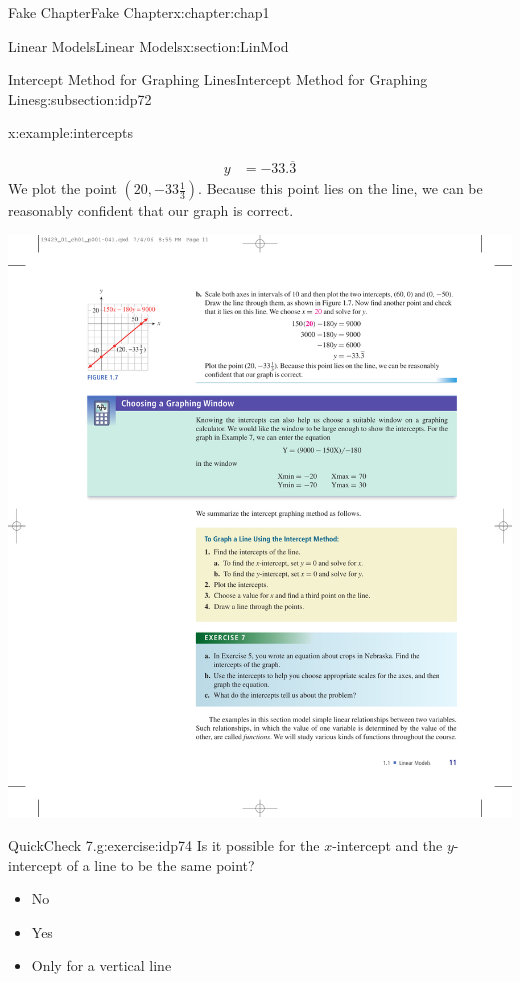 \documentclass[oneside,10pt,]{book}
\numberwithin{equation}{section}
\newcommand{\amp}{&}
\begin{document}
\begin{chapterptx}{Fake Chapter}{}{Fake Chapter}{}{}{x:chapter:chap1}
\begin{sectionptx}{Linear Models}{}{Linear Models}{}{}{x:section:LinMod}
\begin{subsectionptx}{Intercept Method for Graphing Lines}{}{Intercept Method for Graphing Lines}{}{}{g:subsection:idp72}
\begin{example}{}{x:example:intercepts}
\begin{enumerate}[label=\alph*]
\begin{align*}
y \amp =-33.\overline{3}
\end{align*}
We plot the point \((20, -33\frac{1}{3})\). Because this point lies on the line, we can be reasonably confident that our graph is correct.%
\begin{sidebyside}{1}{0.35}{0.35}{0}%
\begin{sbspanel}{0.3}%
\includegraphics[width=\linewidth]{external/photos/fig-example-graph-intercepts.pdf}
\end{sbspanel}%
\end{sidebyside}%
\end{enumerate}
%
\end{example}
\begin{inlineexercise}{QuickCheck 7.}{g:exercise:idp74}%
Is it possible for the \(x\)-intercept and the \(y\)-intercept of a line to be the same point?%
\par
\begin{itemize}[label=$\odot$,leftmargin=3em,]
\item{}No%

\item{}Yes%

\item{}Only for a vertical line%


\end{itemize}
\end{inlineexercise}
\end{subsectionptx}
\end{sectionptx}
\end{chapterptx}
\end{document}
